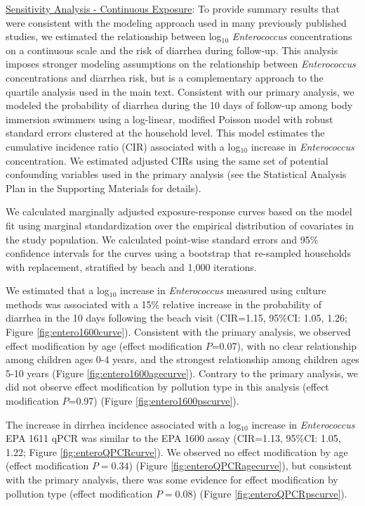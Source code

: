 \documentclass[12pt]{article}\usepackage[]{graphicx}\usepackage[]{color}
\begin{document}
\clearpage
\underline{Sensitivity Analysis - Continuous Exposure}: To provide summary results that were consistent with the modeling approach used in many previously published studies, we estimated the relationship between log$_{10}$ \emph{Enterococcus} concentrations on a continuous scale and the risk of diarrhea during follow-up. This analysis imposes stronger modeling assumptions on the relationship between \emph{Enterococcus} concentrations and diarrhea risk, but is a complementary approach to the quartile analysis used in the main text.  Consistent with our primary analysis, we modeled the probability of diarrhea during the 10 days of follow-up among body immersion swimmers using a log-linear, modified Poisson model with robust standard errors clustered at the household level.  This model estimates the cumulative incidence ratio (CIR) associated with a log$_{10}$ increase in \emph{Enterococcus} concentration.  We estimated adjusted CIRs using the same set of potential confounding variables used in the primary analysis (see the Statistical Analysis Plan in the Supporting Materials for details). 

We calculated marginally adjusted exposure-response curves based on the model fit using marginal standardization over the empirical distribution of covariates in the study population.\supercite{Ahern2009-cv, Muller2014-xn}  We calculated point-wise standard errors and 95\% confidence intervals for the curves using a bootstrap that re-sampled households with replacement, stratified by beach and 1,000 iterations.\supercite{Ahern2009-cv}  

We estimated that a log$_{10}$ increase in \emph{Enterococcus} measured using culture methods was associated with a 15\% relative increase in the probability of diarrhea in the 10 days following the beach visit (CIR=1.15, 95\%CI: 1.05, 1.26; Figure \ref{fig:entero1600curve}). Consistent with the primary analysis, we observed effect modification by age (effect modification $P$=0.07), with no clear relationship among children ages 0-4 years, and the strongest relationship among children ages 5-10 years (Figure \ref{fig:entero1600agecurve}).  Contrary to the primary analysis, we did not observe effect modification by pollution type in this analysis (effect modification $P$=0.97) (Figure \ref{fig:entero1600pscurve}).

The increase in dirrhea incidence associated with a log$_{10}$ increase in \emph{Enterococcus} EPA 1611 qPCR was similar to the EPA 1600 assay (CIR=1.13, 95\%CI: 1.05, 1.22; Figure \ref{fig:enteroQPCRcurve}). We observed no effect modification by age (effect modification $P=0.34$) (Figure \ref{fig:enteroQPCRagecurve}), but consistent with the primary analysis, there was some evidence for effect modification by pollution type  (effect modification $P=0.08$) (Figure \ref{fig:enteroQPCRpscurve}).
\end{document}
